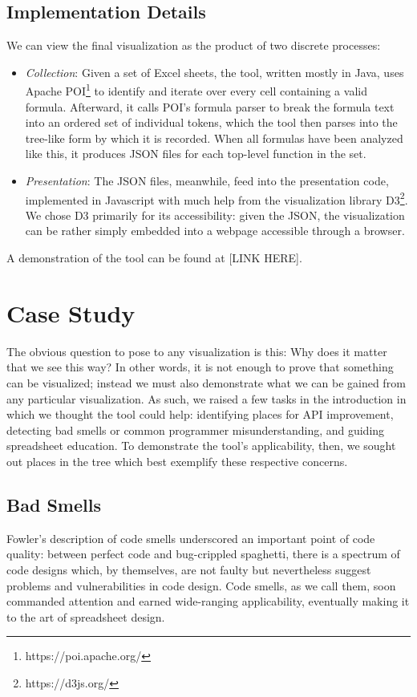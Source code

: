 \documentclass[conference]{IEEEtran}
\begin{document}
	\subsection{Implementation Details} We can view the final visualization as the
	product of two discrete processes: \begin{itemize} \item \textit{Collection}:
		Given a set of Excel sheets, the tool, written mostly in Java, uses Apache
		POI\footnote{https://poi.apache.org/} to identify and iterate over every cell
		containing a valid formula. Afterward, it calls POI's formula parser to break
		the formula text into an ordered set of individual tokens, which the tool then
		parses into the tree-like form by which it is recorded. When all formulas have
		been analyzed like this, it produces JSON files for each top-level function in
		the set. \item \textit{Presentation}: The JSON files, meanwhile, feed into the
		presentation code, implemented in Javascript with much help from the
		visualization library D3\footnote{https://d3js.org/}. We chose D3 primarily for
		its accessibility: given the JSON, the visualization can be rather simply
		embedded into a webpage accessible through a browser. \end{itemize} A
	demonstration of the tool can be found at [LINK HERE].
	
	\section{Case Study} The obvious question to pose to any visualization is this:
	Why does it matter that we see this way? In other words, it is not enough to
	prove that something can be visualized; instead we must also demonstrate what
	we can be gained from any particular visualization. As such, we raised a few
	tasks in the introduction in which we thought the tool could help: identifying
	places for API improvement, detecting bad smells or common programmer
	misunderstanding, and guiding spreadsheet education. To demonstrate the tool's
	applicability, then, we sought out places in the tree which best exemplify
	these respective concerns.
	
	\subsection{Bad Smells} Fowler's description of code smells
	\cite{fowler2009refactoring} underscored an important point of code quality:
	between perfect code and bug-crippled spaghetti,  there is a spectrum of code
	designs which, by themselves, are not faulty but nevertheless suggest problems
	and vulnerabilities in code design. Code smells, as we call them, soon
	commanded attention and earned wide-ranging applicability, eventually making it
	to the art of spreadsheet design.
	
\end{document}
